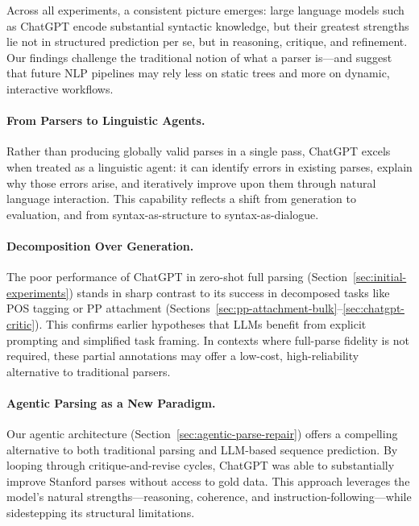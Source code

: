 \label{sec:discussion}

Across all experiments, a consistent picture emerges: large language models such as ChatGPT encode substantial syntactic knowledge, but their greatest strengths lie not in structured prediction per se, but in reasoning, critique, and refinement. Our findings challenge the traditional notion of what a parser is—and suggest that future NLP pipelines may rely less on static trees and more on dynamic, interactive workflows.

\paragraph{From Parsers to Linguistic Agents.}
Rather than producing globally valid parses in a single pass, ChatGPT excels when treated as a linguistic agent: it can identify errors in existing parses, explain why those errors arise, and iteratively improve upon them through natural language interaction. This capability reflects a shift from generation to evaluation, and from syntax-as-structure to syntax-as-dialogue.

\paragraph{Decomposition Over Generation.}
The poor performance of ChatGPT in zero-shot full parsing (Section~\ref{sec:initial-experiments}) stands in sharp contrast to its success in decomposed tasks like POS tagging or PP attachment (Sections~\ref{sec:pp-attachment-bulk}--\ref{sec:chatgpt-critic}). This confirms earlier hypotheses that LLMs benefit from explicit prompting and simplified task framing. In contexts where full-parse fidelity is not required, these partial annotations may offer a low-cost, high-reliability alternative to traditional parsers.

\paragraph{Agentic Parsing as a New Paradigm.}
Our agentic architecture (Section~\ref{sec:agentic-parse-repair}) offers a compelling alternative to both traditional parsing and LLM-based sequence prediction. By looping through critique-and-revise cycles, ChatGPT was able to substantially improve Stanford parses without access to gold data. This approach leverages the model's natural strengths—reasoning, coherence, and instruction-following—while sidestepping its structural limitations.


